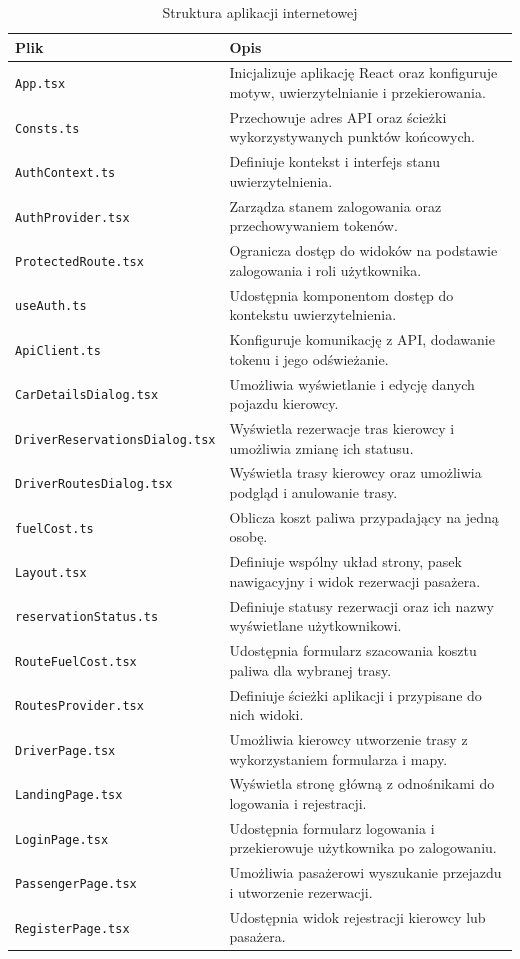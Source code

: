 \begin{table}[htb]
\small
\centering
\caption{Struktura aplikacji internetowej}
\label{tab:pliki-frontend}
\begin{tabularx}{\linewidth}{|l|X|} \hline
Plik & Opis \\ \hline\hline
\texttt{App.tsx}
& Inicjalizuje aplikację React oraz konfiguruje motyw, uwierzytelnianie i przekierowania. \\ \hline
\texttt{Consts.ts}
& Przechowuje adres API oraz ścieżki wykorzystywanych punktów końcowych. \\ \hline
\texttt{AuthContext.ts}
& Definiuje kontekst i interfejs stanu uwierzytelnienia. \\ \hline
\texttt{AuthProvider.tsx}
& Zarządza stanem zalogowania oraz przechowywaniem tokenów. \\ \hline
\texttt{ProtectedRoute.tsx}
& Ogranicza dostęp do widoków na podstawie zalogowania i roli użytkownika. \\ \hline
\texttt{useAuth.ts}
& Udostępnia komponentom dostęp do kontekstu uwierzytelnienia. \\ \hline
\texttt{ApiClient.ts}
& Konfiguruje komunikację z API, dodawanie tokenu i jego odświeżanie. \\ \hline
\texttt{CarDetailsDialog.tsx}
& Umożliwia wyświetlanie i edycję danych pojazdu kierowcy. \\ \hline
\texttt{DriverReservationsDialog.tsx}
& Wyświetla rezerwacje tras kierowcy i umożliwia zmianę ich statusu. \\ \hline
\texttt{DriverRoutesDialog.tsx}
& Wyświetla trasy kierowcy oraz umożliwia podgląd i anulowanie trasy. \\ \hline
\texttt{fuelCost.ts}
& Oblicza koszt paliwa przypadający na jedną osobę. \\ \hline
\texttt{Layout.tsx}
& Definiuje wspólny układ strony, pasek nawigacyjny i widok rezerwacji pasażera. \\ \hline
\texttt{reservationStatus.ts}
& Definiuje statusy rezerwacji oraz ich nazwy wyświetlane użytkownikowi. \\ \hline
\texttt{RouteFuelCost.tsx}
& Udostępnia formularz szacowania kosztu paliwa dla wybranej trasy. \\ \hline
\texttt{RoutesProvider.tsx}
& Definiuje ścieżki aplikacji i przypisane do nich widoki. \\ \hline
\texttt{DriverPage.tsx}
& Umożliwia kierowcy utworzenie trasy z wykorzystaniem formularza i mapy. \\ \hline
\texttt{LandingPage.tsx}
& Wyświetla stronę główną z odnośnikami do logowania i rejestracji. \\ \hline
\texttt{LoginPage.tsx}
& Udostępnia formularz logowania i przekierowuje użytkownika po zalogowaniu. \\ \hline
\texttt{PassengerPage.tsx}
& Umożliwia pasażerowi wyszukanie przejazdu i utworzenie rezerwacji. \\ \hline
\texttt{RegisterPage.tsx}
& Udostępnia widok rejestracji kierowcy lub pasażera. \\ \hline
\end{tabularx}
\end{table}

